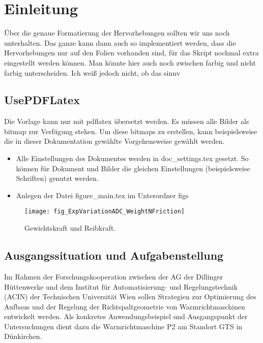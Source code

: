 \chapter{Einleitung}

Über die genaue Formatierung der Hervorhebungen sollten wir uns noch
unterhalten. Das ganze kann dann auch so implementiert werden, dass die
Hervorhebungen nur auf den Folien vorhanden sind, \bzw für das Skript nochmal
extra eingestellt werden können. Man könnte hier auch noch zwischen farbig und
nicht farbig unterscheiden. Ich weiß jedoch nicht, ob das sinnv

\section{UsePDFLatex}

Die Vorlage kann nur mit pdflatex übersetzt werden. Es müssen alle Bilder als bitmap zur Verfügung stehen. Um diese bitmaps zu erstellen, kann beispielsweise die in dieser Dokumentation gewählte Vorgehensweise gewählt werden.
\begin{itemize}
	\item Alle Einstellungen des Dokumentes werden in doc\_settings.tex
	gesetzt. So können für Dokument und Bilder die gleichen Einstellungen
	(beispielsweise Schriften) genutzt werden.
	\item Anlegen der Datei figure\_main.tex im Unterordner figs
\end{itemize}


\begin{figure}
	\centering
	\texttt{[image: fig\_ExpVariationADC\_WeightNFriction]}
	\label{fig:WeightNFriction}
	\caption{Gewichtskraft und Reibkraft.}
\end{figure}


\section{Ausgangssituation und Aufgabenstellung}
Im Rahmen der Forschungskooperation zwischen der AG der Dillinger Hüttenwerke und dem Institut für Automatisierung- und Regelungstechnik (ACIN) der Technischen Universität Wien sollen Strategien zur Optimierung des Aufbaus und der Regelung der Richtspaltgeometrie von Warmrichtmaschinen entwickelt werden. Als konkretes Anwendungsbeispiel und  Ausgangspunkt der Untersuchungen dient dazu die Warmrichtmaschine P2 am Standort GTS in Dünkirchen.

